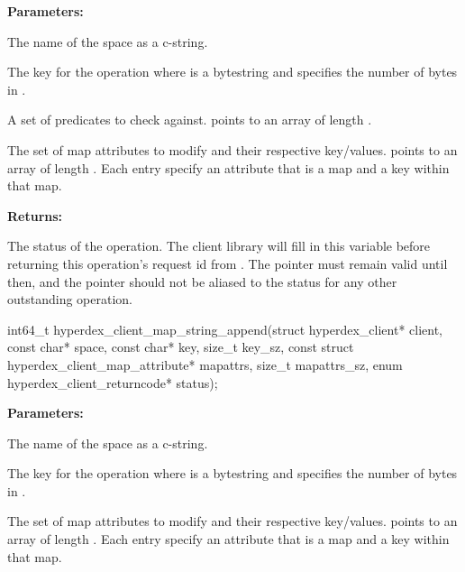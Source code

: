\noindent\textbf{Parameters:}
\begin{description}[labelindent=\widthof{{\code{mapattrs}, \code{mapattrs\_sz}}},leftmargin=*,noitemsep,nolistsep,align=right]
\item[\code{space}] The name of the space as a c-string.
\item[\code{key}, \code{key\_sz}] The key for the operation where  is a bytestring and  specifies the number of bytes in .
\item[\code{checks}, \code{checks\_sz}] A set of predicates to check against.   points to an array of length .
\item[\code{mapattrs}, \code{mapattrs\_sz}] The set of map attributes to modify and their respective key/values.   points to an array of length .  Each entry specify an attribute that is a map and a key within that map.
\end{description}

\noindent\textbf{Returns:}
\begin{description}[labelindent=\widthof{{\code{status}}},leftmargin=*,noitemsep,nolistsep,align=right]
\item[\code{status}] The status of the operation.  The client library will fill in this variable before returning this operation's request id from .  The pointer must remain valid until then, and the pointer should not be aliased to the status for any other outstanding operation.
\end{description}

\funcsep
{}
\begin{ccode}
int64_t hyperdex_client_map_string_append(struct hyperdex_client* client,
                const char* space,
                const char* key, size_t key_sz,
                const struct hyperdex_client_map_attribute* mapattrs, size_t mapattrs_sz,
                enum hyperdex_client_returncode* status);
\end{ccode}
\funcdesc 

\noindent\textbf{Parameters:}
\begin{description}[labelindent=\widthof{{\code{mapattrs}, \code{mapattrs\_sz}}},leftmargin=*,noitemsep,nolistsep,align=right]
\item[\code{space}] The name of the space as a c-string.
\item[\code{key}, \code{key\_sz}] The key for the operation where  is a bytestring and  specifies the number of bytes in .
\item[\code{mapattrs}, \code{mapattrs\_sz}] The set of map attributes to modify and their respective key/values.   points to an array of length .  Each entry specify an attribute that is a map and a key within that map.
\end{description}

